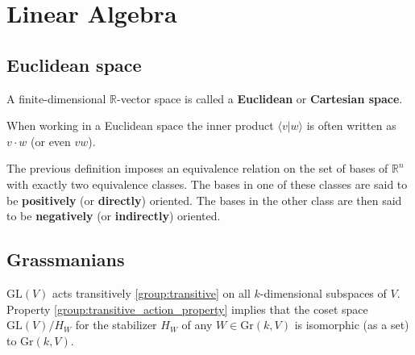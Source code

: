 \chapter{Linear Algebra}\label{chapter:linear_algebra}






\section{Euclidean space}

    A finite-dimensional $\mathbb{R}$-vector space is called a \textbf{Euclidean} or \textbf{Cartesian space}.

    \begin{notation}
        When working in a Euclidean space the inner product $\langle v|w\rangle$ is often written as $v\cdot w$ (or even $vw$).
    \end{notation}

    \begin{result}
        The previous definition imposes an equivalence relation on the set of bases of $\mathbb{R}^n$ with exactly two equivalence classes. The bases in one of these classes are said to be \textbf{positively} (or \textbf{directly}) oriented. The bases in the other class are then said to be \textbf{negatively} (or \textbf{indirectly}) oriented.
    \end{result}

\section{Grassmanians}

    \begin{property}\label{linalgebra:grassmannian_construction}
        $\text{GL}(V)$ acts transitively \ref{group:transitive} on all $k$-dimensional subspaces of $V$. Property \ref{group:transitive_action_property} implies that the coset space $\text{GL}(V)/H_W$ for the stabilizer $H_W$ of any $W\in \text{Gr}(k,V)$ is isomorphic (as a set) to $\text{Gr}(k,V)$.
    \end{property}

